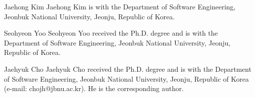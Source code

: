 \documentclass[journal]{IEEEtran}
\begin{document}
\begin{IEEEbiographynophoto}{Jaehong Kim}
Jaehong Kim is with the Department of Software Engineering,
Jeonbuk National University, Jeonju, Republic of Korea.
\end{IEEEbiographynophoto}

\begin{IEEEbiographynophoto}{Seohyeon Yoo}
Seohyeon Yoo received the Ph.D. degree and is with the Department of Software Engineering,
Jeonbuk National University, Jeonju, Republic of Korea.
\end{IEEEbiographynophoto}

\begin{IEEEbiographynophoto}{Jaehyuk Cho}
Jaehyuk Cho received the Ph.D. degree and is with the Department of Software Engineering,
Jeonbuk National University, Jeonju, Republic of Korea
(e-mail: chojh@jbnu.ac.kr). He is the corresponding author.
\end{IEEEbiographynophoto}
\end{document}
